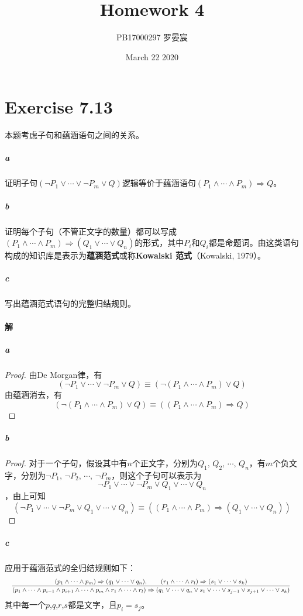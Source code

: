 \documentclass{article}
\title{Homework 4}
\author{PB17000297 罗晏宸}
\date{March 22 2020}
\begin{document}
\maketitle

\section{Exercise 7.13}
本题考虑子句和蕴涵语句之间的关系。
\subparagraph{a}
证明子句$(\lnot P_1 \lor \cdots \lor \lnot P_m \lor Q)$逻辑等价于蕴涵语句$(P_1 \land \cdots \land P_m) \Rightarrow Q$。
\subparagraph{b}
证明每个子句（不管正文字的数量）都可以写成$(P_1 \land \cdots \land P_m) \Rightarrow (Q_1 \lor \cdots \lor Q_n)$的形式，其中$P_i$和$Q_i$都是命题词。由这类语句构成的知识库是表示为\textbf{蕴涵范式}或称\textbf{Kowalski 范式}（Kowalski, 1979）。
\subparagraph{c}
写出蕴涵范式语句的完整归结规则。

\paragraph{解}
\subparagraph{a}
\begin{proof}
    由De Morgan律，有
    \begin{equation*}
        (\lnot P_1 \lor \cdots \lor \lnot P_m \lor Q) \equiv (\lnot (P_1 \land \cdots \land P_m) \lor Q)
    \end{equation*}
    由蕴涵消去，有
    \begin{equation*}
        (\lnot (P_1 \land \cdots \land P_m) \lor Q) \equiv ((P_1 \land \cdots \land P_m) \Rightarrow Q)
    \end{equation*}
\end{proof}

\subparagraph{b}
\begin{proof}
对于一个子句，假设其中有$n$个正文字，分别为$Q_1,\, Q_2,\, \cdots,\, Q_n$，有$m$个负文字，分别为$\lnot P_1,\, \lnot P_2,\, \cdots,\, \lnot P_m$，则这个子句可以表示为$$\lnot P_1 \lor \cdots \lor \lnot P_m \lor Q_1 \lor \cdots \lor Q_n$$，由上可知
\begin{equation*}
    (\lnot P_1 \lor \cdots \lor \lnot P_m \lor Q_1 \lor \cdots \lor Q_n) \equiv ((P_1 \land \cdots \land P_m) \Rightarrow (Q_1 \lor \cdots \lor Q_n))
\end{equation*}
\end{proof}

\subparagraph{c}
应用于蕴涵范式的全归结规则如下：
\begin{equation*}
\resizebox{\linewidth}{!}{%
    $\displaystyle \frac{(p_1 \land \cdots \land p_m) \Rightarrow (q_1 \lor \cdots \lor q_n), \qquad (r_1 \land \cdots \land r_l) \Rightarrow (s_1 \lor \cdots \lor s_k)}{(p_1 \land \cdots \land p_{i - 1} \land p_{i + 1} \land \cdots \land p_m \land r_1 \land \cdots \land r_l) \Rightarrow (q_1 \lor \cdots \lor q_n \lor s_1 \lor \cdots \lor s_{j - 1} \lor s_{j + 1} \lor \cdots \lor s_k)}$
}
\end{equation*}
其中每一个$p$,$q$,$r$,$s$都是文字，且$p_i = s_j$。
\end{document}
